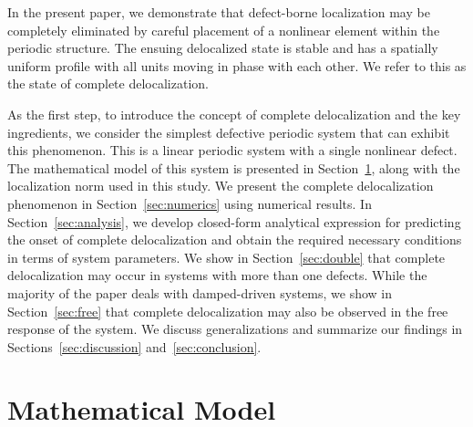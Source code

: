 \documentclass[aps,pre,twocolumn,groupedaddress]{revtex4-1}
\begin{document}
{\color{black}
In the present paper, we demonstrate that defect-borne localization may be completely eliminated by careful placement of a nonlinear element within the periodic structure. The ensuing delocalized state is stable and has a spatially uniform profile with all units moving in phase with each other. We refer to this as the state of complete delocalization. 
}

As the first step, to introduce the concept of complete delocalization and the key ingredients, we consider the simplest defective periodic system that can exhibit this phenomenon. This is a linear periodic system with a single nonlinear defect. The mathematical model of this system is presented in Section~\ref{sec:model}, along with the localization norm %
used in this study. 
We present the complete delocalization phenomenon in Section~\ref{sec:numerics} using numerical results. In Section~\ref{sec:analysis}, we develop closed-form analytical expression for predicting the onset of complete delocalization and obtain the required necessary conditions in terms of system parameters. We show in Section~\ref{sec:double} that complete delocalization may occur in systems with more than one defects. While the majority of the paper deals with damped-driven systems, we show in Section~\ref{sec:free} that complete delocalization may also be observed in the free response of the system. %
We discuss generalizations and summarize our findings in Sections~\ref{sec:discussion} and~\ref{sec:conclusion}. 








\section{Mathematical Model}
\label{sec:model}
\end{document}

